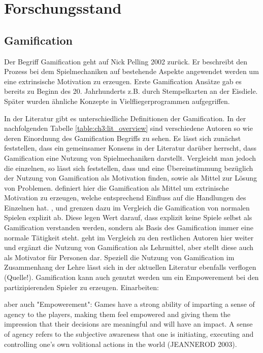 \chapter{Forschungsstand}
\label{ch3:Forschungsstand}

\section{Gamification}
\label{ch3:s:Gamification}

Der Begriff Gamification geht auf Nick Pelling 2002 zurück.
Er beschreibt den Prozess bei dem Spielmechaniken auf bestehende Aspekte angewendet werden um eine extrinsische Motivation zu erzeugen.\citep{Marczewski.2013}
Erste Gamification Ansätze gab es bereits zu Beginn des 20. Jahrhunderts z.B. durch Stempelkarten an der Eisdiele. Später wurden ähnliche Konzepte in Vielfliegerprogrammen aufgegriffen.

In der Literatur gibt es unterschiedliche Definitionen der Gamification.
In der nachfolgenden Tabelle \ref{table:ch3:lit_overview} sind verschiedene Autoren so wie deren Einordnung des Gamification Begriffs zu sehen.
Es lässt sich zunächst feststellen, dass ein gemeinsamer Konsens in der Literatur darüber herrscht, dass Gamification eine Nutzung von Spielmechaniken darstellt.
Vergleicht man jedoch die einzelnen, so lässt sich feststellen, dass \cite{Zichermann.2011} und \cite{Kapp.2012} eine Übereinstimmung bezüglich der Nutzung von Gamification als Motivation finden, sowie als Mittel zur Lösung von Problemen. \cite{Zichermann.2011} definiert hier die Gamification als Mittel um extrinische Motivation zu erzeugen, welche entsprechend Einfluss auf die Handlungen des Einzelnen hat.
\cite{Deterding.2011}, \cite{Breuer.2011} und \cite{Oxford.2013} grenzen dazu im Vergleich die Gamification von normalen Spielen explizit ab. Diese legen Wert darauf, dass explizit keine Spiele selbst als Gamification verstanden werden, sondern als Basis des Gamification  immer eine normale Tätigkeit steht.
\cite{Kapp.2012} geht im Vergleich zu den restlichen Autoren hier weiter und ergänzt die Nutzung von Gamification als Lehrmittel, aber stellt diese auch als Motivator für Personen dar. Speziell die Nutzung von Gamification im Zusammenhang der Lehre lässt sich in der aktuellen Literatur ebenfalls verflogen (Quelle!).
Gamification kann auch genutzt werden um ein Empowerement bei den partizipierenden Spieler zu erzeugen. Einarbeiten:

aber auch "Empowerement":
Games have a strong ability of imparting a sense of agency to the players, making them feel
empowered and giving them the impression that their decisions are meaningful and will
have an impact. A sense of agency refers to the subjective awareness that one is initiating,
executing and controlling one’s own volitional actions in the world (JEANNEROD 2003).

